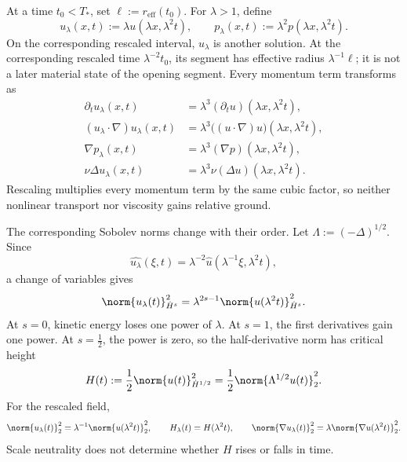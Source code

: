 
At a time \(t_0<T_*\), set \(\ell:=r_{\mathrm{eff}}(t_0)\). For \(\lambda>1\), define
\[
  u_\lambda(x,t)
  :=
  \lambda u(\lambda x,\lambda^2t),
  \qquad
  p_\lambda(x,t)
  :=
  \lambda^2p(\lambda x,\lambda^2t).
\]
On the corresponding rescaled interval, \(u_\lambda\) is another \NavierStokes{} solution. At the corresponding rescaled time \(\lambda^{-2}t_0\), its segment has effective radius \(\lambda^{-1}\ell\); it is not a later material state of the opening segment. Every momentum term transforms as
\[
\begin{aligned}
  \partial_tu_\lambda(x,t)
  &=
  \lambda^3(\partial_tu)(\lambda x,\lambda^2t),
  \\
  (u_\lambda\cdot\nabla)u_\lambda(x,t)
  &=
  \lambda^3\bigl((u\cdot\nabla)u\bigr)(\lambda x,\lambda^2t),
  \\
  \nabla p_\lambda(x,t)
  &=
  \lambda^3(\nabla p)(\lambda x,\lambda^2t),
  \\
  \nu\Delta u_\lambda(x,t)
  &=
  \lambda^3\nu(\Delta u)(\lambda x,\lambda^2t).
\end{aligned}
\]
Rescaling multiplies every momentum term by the same cubic factor, so neither nonlinear transport nor viscosity gains relative ground.


The corresponding Sobolev norms change with their order. Let \(\Lambda:=(-\Delta)^{1/2}\). Since
\[
  \widehat{u_\lambda}(\xi,t)
  =
  \lambda^{-2}\widehat u(\lambda^{-1}\xi,\lambda^2t),
\]
a change of variables gives
\[
  \norm{u_\lambda(t)}_{\dot H^s}^2
  =
  \lambda^{2s-1}
  \norm{u(\lambda^2t)}_{\dot H^s}^2.
\]
At \(s=0\), kinetic energy loses one power of \(\lambda\). At \(s=1\), the first derivatives gain one power. At \(s=\tfrac12\), the power is zero, so the half-derivative norm has critical height
\[
  H(t)
  :=
  \frac12\norm{u(t)}_{\dot H^{1/2}}^2
  =
  \frac12\norm{\Lambda^{1/2}u(t)}_2^2.
\]
For the rescaled field,
\[
  \norm{u_\lambda(t)}_2^2
  =
  \lambda^{-1}\norm{u(\lambda^2t)}_2^2,
  \qquad
  H_\lambda(t)=H(\lambda^2t),
  \qquad
  \norm{\nabla u_\lambda(t)}_2^2
  =
  \lambda\norm{\nabla u(\lambda^2t)}_2^2.
\]
Scale neutrality does not determine whether \(H\) rises or falls in time.


